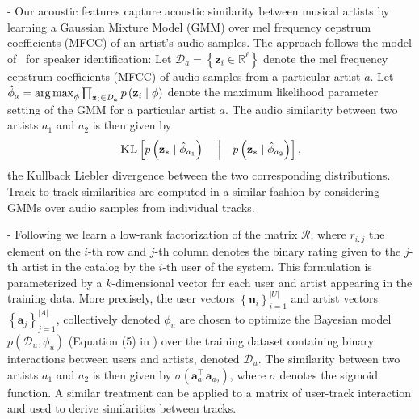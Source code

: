  -
Our acoustic features capture acoustic similarity between musical artists by learning a Gaussian Mixture Model (GMM) over mel frequency cepstrum coefficients (MFCC) of an artist's audio samples. The approach follows the model of~\cite{ReynoldsQD00} for speaker identification: 
Let $\mathcal{D}_a=\left\{\mathbf{z}_i \in \mathbb{R}^\ell\right\}$ denote the mel frequency cepstrum coefficients (MFCC) of audio samples from a particular artist $a$. 
Let $\hat{\phi}_a=\argmax_{\phi} \prod_{\mathbf{z}_i\in\mathcal{D}_a} p\left(\mathbf{z}_i\mid\phi\right)$ denote the maximum likelihood parameter setting of the GMM for a particular artist $a$. The audio similarity between two artists $a_1$ and $a_2$ is then given by \begin{equation}\textsc{KL}\left[ p\left(\mathbf{z_*}\mid\hat{\phi}_{a_1}\right) \quad \middle| \middle| \quad  p\left(\mathbf{z_*} \mid \hat{\phi}_{a_2}\right)\right
],\end{equation} the Kullback Liebler divergence between the two corresponding distributions.
Track to track similarities are computed in a similar fashion by considering GMMs over audio samples from individual tracks.  

 -
Following \cite{xbox-www} we learn a low-rank factorization of the matrix $\mathcal{R}$,
 where $r_{i,j}$ the element on the $i$-th row and $j$-th column denotes the binary rating given to the $j$-th artist in the catalog by the $i$-th user of the system. This formulation is parameterized by a $k$-dimensional vector for each user and artist appearing in the training data. More precisely, the user vectors $\left\{\mathbf{u}_i\right\}_{i=1}^{|U|}$ and artist vectors $\left\{\mathbf{a}_j\right\}_{j=1}^{|A|}$, collectively denoted $\phi_u$ are chosen to optimize the Bayesian model $p(\mathcal{D}_u,\phi_u)$ (Equation (5) in \cite{xbox-www}) over the training dataset containing binary interactions between users and artists, denoted $\mathcal{D}_u$.  The similarity between two artists $a_1$ and $a_2$ is then given by $\sigma \left(\mathbf{a}_{a_1}^\top\mathbf{a}_{a_2}\right)$, where $\sigma$ denotes the sigmoid function. A similar treatment can be applied to a matrix of user-track interaction and used to derive similarities between tracks.

